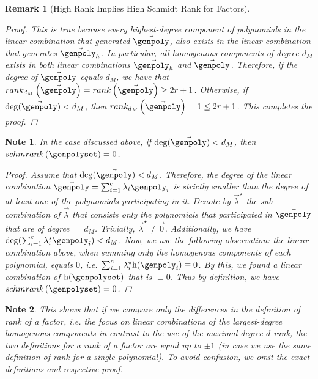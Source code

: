\documentclass[10pt,a4paper]{article}
\newtheorem{remark}[theorem]{Remark}
\newtheorem*{note*}{Note}
\newcommand{\parens}[1]{\left( #1 \right)}
\newcommand{\degree}[0]{d}
\newcommand{\homopart}[1]{\mathrm{h}({#1})}
\newcommand{\rank}[1]{rank \parens{#1}}
\newcommand{\drank}[2]{rank_{#1} \parens{#2}}
\newcommand{\schmrank}[1]{schmrank \parens{#1}}
\newcommand{\rankval}[0]{{{r}}}
\begin{document}
\begin{remark}[High Rank Implies High Schmidt Rank for Factors]
\begin{proof}
        This is true because every highest-degree component of polynomials in the linear combination that generated $\vec{\genpoly}$,
        also exists in the linear combination that generates $\vec{\genpoly_h}$.
        In particular, all homogenous components of degree $\degree_M$ exists in both linear combinations $\vec{\genpoly_h}$ and $\vec{\genpoly}$.
        Therefore, if the degree of $\vec{\genpoly}$ equals $\degree_M$, we have that $\drank{\degree_M}{\vec{\genpoly}} = \rank{\vec{\genpoly}} \geq 2 \rankval + 1$.
        Otherwise, if $\deg(\vec{\genpoly}) < \degree_M$, then $\drank{\degree_M}{\vec{\genpoly}} = 1 \leq 2 \rankval + 1$.
        This completes the proof.
        \newline
    \end{proof}
\end{remark}
\begin{note*}
    In the case discussed above, if $\deg(\vec{\genpoly}) < \degree_M$, then $\schmrank{\genpolyset} = 0$.
    \begin{proof}
        Assume that $\deg(\vec{\genpoly}) < \degree_M$.
        Therefore, the degree of the linear combination $\vec{\genpoly} = \sum_{i=1}^{c} {\lambda_i \genpoly_i}$ is strictly smaller than the degree of at least one of the polynomials participating in it.
        Denote by $\vec{\lambda}^\star$ the sub-combination of $\vec{\lambda}$ that consists only the polynomials that participated in $\vec{\genpoly}$ that are of degree $= \degree_M$.
        Trivially, $\vec{\lambda}^\star \neq \vec{0}$.
        Additionally, we have $\deg(\sum_{i=1}^{c} {\lambda_i^\star \genpoly_i}) < \degree_M$.
        Now, we use the following observation: the linear combination above, when summing only the homogenous components of each polynomial, equals $0$, i.e. $\sum_{i=1}^{c} {\lambda_i^\star \homopart{\genpoly_i}} \equiv 0$.
        By this, we found a linear combination of $\homopart{\genpolyset}$ that is $\equiv 0$.
        Thus by definition, we have $\schmrank{\genpolyset} = 0$.
    \end{proof}
\end{note*}
\begin{note*}
    This shows that if we compare only the differences in the definition of rank of a factor, i.e. the focus on linear combinations of the largest-degree homogenous components in contrast to the use of the maximal degree $\degree$-rank,
    the two definitions for a rank of a factor are equal up to $\pm 1$
    (in case we use the same definition of rank for a single polynomial).
    To avoid confusion, we omit the exact definitions and respective proof.
\end{note*}
\end{document}
